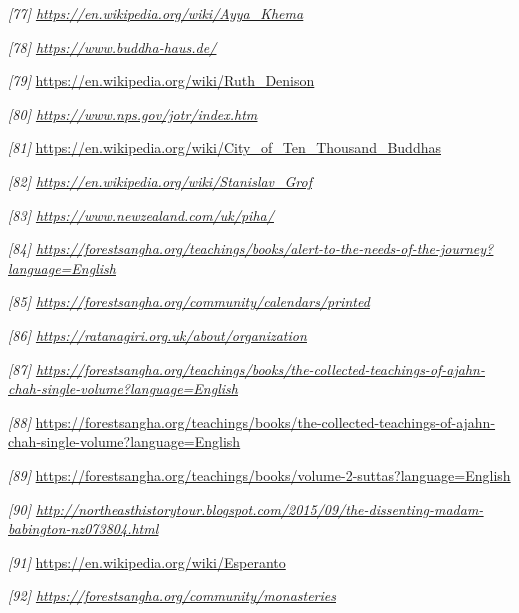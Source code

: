 \emph{{[}77{]}
\href{https://en.wikipedia.org/wiki/Ayya_Khema}{\underline{https://en.wikipedia.org/wiki/Ayya\_Khema}}}

\emph{{[}78{]}
\href{https://www.buddha-haus.de/}{\underline{https://www.buddha-haus.de/}}}

\emph{{[}79{]}} \url{https://en.wikipedia.org/wiki/Ruth_Denison}

\emph{{[}80{]}
\href{https://www.nps.gov/jotr/index.htm}{\underline{https://www.nps.gov/jotr/index.htm}}}

\emph{{[}81{]}}
\url{https://en.wikipedia.org/wiki/City_of_Ten_Thousand_Buddhas}

\emph{{[}82{]}
\href{https://en.wikipedia.org/wiki/Stanislav_Grof}{\underline{https://en.wikipedia.org/wiki/Stanislav\_Grof}}}

\emph{{[}83{]}
\href{https://www.newzealand.com/uk/piha/}{\underline{https://www.newzealand.com/uk/piha/}}}

\emph{{[}84{]}
\href{https://forestsangha.org/teachings/books/alert-to-the-needs-of-the-journey?language=English}{\underline{https://forestsangha.org/teachings/books/alert-to-the-needs-of-the-journey?language=English}}}

\emph{{[}85{]}
\href{https://forestsangha.org/community/calendars/printed}{\underline{https://forestsangha.org/community/calendars/printed}}}

\emph{{[}86{]}
\href{https://ratanagiri.org.uk/about/organization}{\underline{https://ratanagiri.org.uk/about/organization}}}

\emph{{[}87{]}
\href{https://forestsangha.org/teachings/books/the-collected-teachings-of-ajahn-chah-single-volume?language=English}{\underline{https://forestsangha.org/teachings/books/the-collected-teachings-of-ajahn-chah-single-volume?language=English}}}

\emph{{[}88{]}}
\url{https://forestsangha.org/teachings/books/the-collected-teachings-of-ajahn-chah-single-volume?language=English}

\emph{{[}89{]}}
\url{https://forestsangha.org/teachings/books/volume-2-suttas?language=English}

\emph{{[}90{]}
\href{http://northeasthistorytour.blogspot.com/2015/09/the-dissenting-madam-babington-nz073804.html}{\underline{http://northeasthistorytour.blogspot.com/2015/09/the-dissenting-madam-babington-nz073804.html}}}

\emph{{[}91{]}} \url{https://en.wikipedia.org/wiki/Esperanto}

\emph{{[}92{]}
\href{https://forestsangha.org/community/monasteries}{\underline{https://forestsangha.org/community/monasteries}}}

